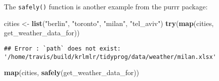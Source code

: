\documentclass[]{book}
\newenvironment{Shaded}{\begin{snugshade}}{\end{snugshade}}
\newcommand{\KeywordTok}[1]{\textcolor[rgb]{0.13,0.29,0.53}{\textbf{#1}}}
\newcommand{\NormalTok}[1]{#1}
\newcommand{\StringTok}[1]{\textcolor[rgb]{0.31,0.60,0.02}{#1}}
\begin{document}
The \texttt{safely()} function is another example from the purrr package:

\begin{Shaded}
\begin{Highlighting}[]
\NormalTok{cities <-}\StringTok{ }\KeywordTok{list}\NormalTok{(}\StringTok{"berlin"}\NormalTok{, }\StringTok{"toronto"}\NormalTok{, }\StringTok{"milan"}\NormalTok{, }\StringTok{"tel_aviv"}\NormalTok{)}
\KeywordTok{try}\NormalTok{(}\KeywordTok{map}\NormalTok{(cities, get_weather_data_for))}
\end{Highlighting}
\end{Shaded}

\begin{verbatim}
## Error : `path` does not exist: '/home/travis/build/krlmlr/tidyprog/data/weather/milan.xlsx'
\end{verbatim}

\begin{Shaded}
\begin{Highlighting}[]
\KeywordTok{map}\NormalTok{(cities, }\KeywordTok{safely}\NormalTok{(get_weather_data_for))}
\end{Highlighting}
\end{Shaded}
\end{document}
